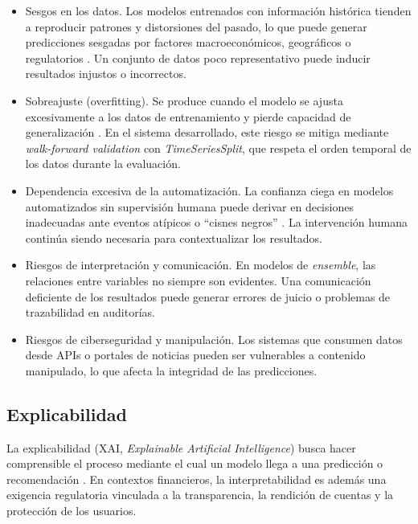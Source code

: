   \begin{itemize}
      \item {Sesgos en los datos}. Los modelos entrenados con información
      histórica tienden a reproducir patrones y distorsiones del pasado, lo que
      puede generar predicciones sesgadas por factores macroeconómicos, geográficos
      o regulatorios \parencite{barredoarrieta2020explainable}. Un conjunto de datos
      poco representativo puede inducir resultados injustos o incorrectos.

      \item {Sobreajuste (overfitting)}. Se produce cuando el modelo se ajusta
      excesivamente a los datos de entrenamiento y pierde capacidad de generalización
      \parencite{goodfellow2016deep}. En el sistema desarrollado, este riesgo se
      mitiga mediante \textit{walk-forward validation} con \textit{TimeSeriesSplit},
      que respeta el orden temporal de los datos durante la evaluación.

      \item {Dependencia excesiva de la automatización}. La confianza ciega
      en modelos automatizados sin supervisión humana puede derivar en decisiones
      inadecuadas ante eventos atípicos o ``cisnes negros'' \parencite{taleb2007black}.       
      La intervención humana continúa siendo necesaria para contextualizar los
      resultados.

      \item {Riesgos de interpretación y comunicación}. En modelos de
      \textit{ensemble}, las relaciones entre variables no siempre son evidentes.
      Una comunicación deficiente de los resultados puede generar errores de juicio
      o problemas de trazabilidad en auditorías.

      \item {Riesgos de ciberseguridad y manipulación}. Los sistemas que
      consumen datos desde APIs o portales de noticias pueden ser vulnerables a
      contenido manipulado, lo que afecta la integridad de las predicciones.
  \end{itemize}



\subsection {Explicabilidad}

  La explicabilidad (XAI, \textit{Explainable Artificial Intelligence}) busca hacer
  comprensible el proceso mediante el cual un modelo llega a una predicción o
  recomendación \parencite{arrieta2020explainable}. En contextos financieros, la
  interpretabilidad es además una exigencia regulatoria vinculada a la transparencia,
  la rendición de cuentas y la protección de los usuarios.

